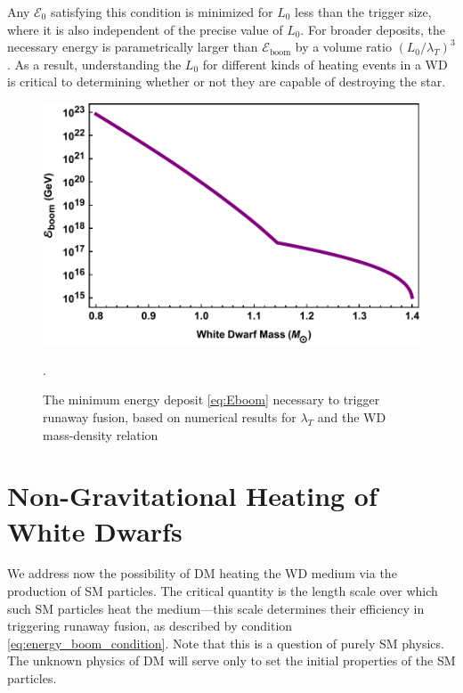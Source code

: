 \documentclass[twocolumn, preprintnumbers,amsmath,amssymb,prd, superscriptaddress]{revtex4}
\newcommand{\Ez}{\mathcal{E}_0}
\newcommand{\Eboom}{\mathcal{E}_\text{boom}}
\begin{document}
Any $\Ez$ satisfying this condition is minimized for $L_0$ less than the trigger size, where it is also independent of the precise value of $L_0$.
For broader deposits, the necessary energy is parametrically larger than $\Eboom$ by a volume ratio $(L_0/\lambda_T)^3$.
As a result, understanding the $L_0$ for different kinds of heating events in a WD is critical to determining whether or not they are capable of destroying the star.
\begin{figure}
\includegraphics[scale=.45]{Eboom.pdf}
\caption{The minimum energy deposit \eqref{eq:Eboom} necessary to trigger runaway fusion, based on numerical results for $\lambda_T$ \cite{Woosley} and the WD mass-density relation \cite{cococubed}}.
\label{fig:Eboom}
\end{figure}

\section{Non-Gravitational Heating of White Dwarfs}
\label{sec:SMHeating}

We address now the possibility of DM heating the WD medium via the production of SM particles.
The critical quantity is the length scale over which such SM particles heat the medium---this scale determines their efficiency in triggering runaway fusion, as described by condition \eqref{eq:energy_boom_condition}.
Note that this is a question of purely SM physics.
The unknown physics of DM will serve only to set the initial properties of the SM particles.
\end{document}

